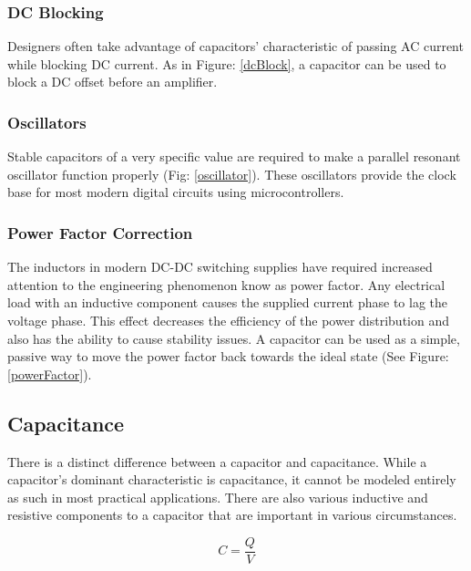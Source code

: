 \subsubsection{DC Blocking}

Designers often take advantage of capacitors' characteristic of passing AC current while blocking DC current. As in Figure: \ref{dcBlock}, a capacitor can be used to block a DC offset before an amplifier.

\subsubsection{Oscillators}


Stable capacitors of a very specific value are required to make a parallel resonant oscillator function properly (Fig: \ref{oscillator}). These oscillators provide the clock base for most modern digital circuits using microcontrollers.

\subsubsection{Power Factor Correction}


The inductors in modern DC-DC switching supplies have required increased attention to the engineering phenomenon know as power factor. Any electrical load with an inductive component causes the supplied current phase to lag the voltage phase. This effect decreases the efficiency of the power distribution and also has the ability to cause stability issues. A capacitor can be used as a simple, passive way to move the power factor back towards the ideal state (See Figure: \ref{powerFactor}). \cite{cui_powerFactor}


\subsection{Capacitance}

There is a distinct difference between a capacitor and capacitance. While a capacitor's dominant characteristic is capacitance, it cannot be modeled entirely as such in most practical applications. There are also various inductive and resistive components to a capacitor that are important in various circumstances.

\begin{equation}
\label{cqv}
C=\frac{Q}{V}
\end{equation}

